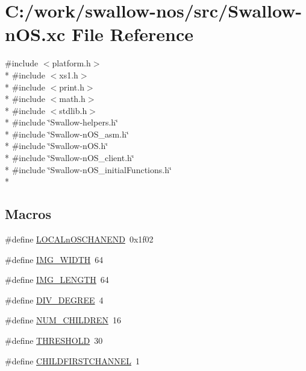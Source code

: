\hypertarget{_swallow-n_o_s_8xc}{}\section{C\+:/work/swallow-\/nos/src/\+Swallow-\/n\+O\+S.xc File Reference}
\label{_swallow-n_o_s_8xc}
{\ttfamily \#include $<$platform.\+h$>$}\\*
{\ttfamily \#include $<$xs1.\+h$>$}\\*
{\ttfamily \#include $<$print.\+h$>$}\\*
{\ttfamily \#include $<$math.\+h$>$}\\*
{\ttfamily \#include $<$stdlib.\+h$>$}\\*
{\ttfamily \#include \char`\"{}Swallow-\/helpers.\+h\char`\"{}}\\*
{\ttfamily \#include \char`\"{}Swallow-\/n\+O\+S\+\_\+asm.\+h\char`\"{}}\\*
{\ttfamily \#include \char`\"{}Swallow-\/n\+O\+S.\+h\char`\"{}}\\*
{\ttfamily \#include \char`\"{}Swallow-\/n\+O\+S\+\_\+client.\+h\char`\"{}}\\*
{\ttfamily \#include \char`\"{}Swallow-\/n\+O\+S\+\_\+initial\+Functions.\+h\char`\"{}}\\*
\subsection*{Macros}
\begin{DoxyCompactItemize}
\item 
\#define \hyperlink{_swallow-n_o_s_8xc_a63f27a839bf3aba3712909a1c72a4778}{L\+O\+C\+A\+Ln\+O\+S\+C\+H\+A\+N\+E\+N\+D}~0x1f02
\item 
\#define \hyperlink{_swallow-n_o_s_8xc_a6a5a49798a96db987404c8aa3b804fe3}{I\+M\+G\+\_\+\+W\+I\+D\+T\+H}~64
\item 
\#define \hyperlink{_swallow-n_o_s_8xc_a586da4866646908804a9378b486301cc}{I\+M\+G\+\_\+\+L\+E\+N\+G\+T\+H}~64
\item 
\#define \hyperlink{_swallow-n_o_s_8xc_a837ef5a691080a0d5029b79bb2e51bc4}{D\+I\+V\+\_\+\+D\+E\+G\+R\+E\+E}~4
\item 
\#define \hyperlink{_swallow-n_o_s_8xc_a5abfca151ab0db98334eff163e9bfc99}{N\+U\+M\+\_\+\+C\+H\+I\+L\+D\+R\+E\+N}~16
\item 
\#define \hyperlink{_swallow-n_o_s_8xc_a4679d8ea8690999a6c6c7c0cb245c879}{T\+H\+R\+E\+S\+H\+O\+L\+D}~30
\item 
\#define \hyperlink{_swallow-n_o_s_8xc_a42b7dc8959eae62cab5ef4b4fd010b7d}{C\+H\+I\+L\+D\+F\+I\+R\+S\+T\+C\+H\+A\+N\+N\+E\+L}~1
\end{DoxyCompactItemize}
